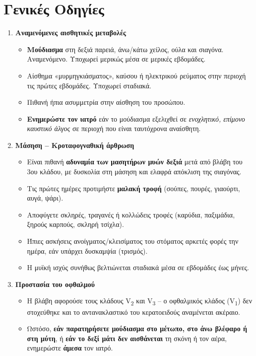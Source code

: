 \documentclass[10pt,greek]{article}
\begin{document}
\section*{Γενικές Οδηγίες}
\begin{enumerate}[label=\arabic*.]
\setlength{\parskip}{6pt}
  \item \textbf{Αναμενόμενες αισθητικές μεταβολές}
       \begin{itemize}
\item \textbf{Μούδιασμα} στη δεξιά παρειά, άνω/κάτω χείλος, ούλα και σιαγόνα. Αναμενόμενο. Υποχωρεί μερικώς μέσα σε μερικές εβδομάδες.
\item Αίσθημα «μυρμηγκιάσματος», καύσου ή ηλεκτρικού ρεύματος στην περιοχή τις πρώτες εβδομάδες. Υποχωρεί σταδιακά.
\item Πιθανή ήπια ασυμμετρία στην αίσθηση του προσώπου.
\item \textbf{Ενημερώστε τον ιατρό} εάν το μούδιασμα εξελιχθεί σε \emph{ενοχλητικό, επίμονο καυστικό άλγος} σε περιοχή που είναι ταυτόχρονα αναίσθητη.
    \end{itemize}
  \item \textbf{Μάσηση -- Κροταφογναθική άρθρωση}
       \begin{itemize}
\item Είναι πιθανή \textbf{αδυναμία των μασητήρων μυών δεξιά} μετά από βλάβη του 3ου κλάδου, με δυσκολία στη μάσηση και ελαφρά απόκλιση της σιαγόνας.
\item Τις πρώτες ημέρες προτιμήστε \textbf{μαλακή τροφή} (σούπες, πουρές, γιαούρτι, αυγά, ψάρι).
\item Αποφύγετε σκληρές, τραγανές ή κολλώδεις τροφές (καρύδια, παξιμάδια, ξηρούς καρπούς, σκληρή τσίχλα).
\item Ήπιες ασκήσεις ανοίγματος/κλεισίματος του στόματος αρκετές φορές την ημέρα, εάν υπάρχει δυσκαμψία (τρισμός).
\item Η μυϊκή ισχύς συνήθως βελτιώνεται σταδιακά μέσα σε εβδομάδες έως μήνες.
    \end{itemize}
  \item \textbf{Προστασία του οφθαλμού}
       \begin{itemize}
\item Η βλάβη αφορούσε τους κλάδους V\textsubscript{2} και V\textsubscript{3} -- ο οφθαλμικός κλάδος (V\textsubscript{1}) δεν στοχεύθηκε και το αντανακλαστικό του κερατοειδούς αναμένεται ακέραιο.
\item Ωστόσο, \textbf{εάν παρατηρήσετε μούδιασμα στο μέτωπο, στο άνω βλέφαρο ή στη μύτη}, ή \textbf{εάν το δεξί μάτι δεν αισθάνεται} τη σκόνη ή τον αέρα, ενημερώστε \textbf{άμεσα} τον ιατρό.

\end{itemize}
\end{enumerate}
\end{document}
